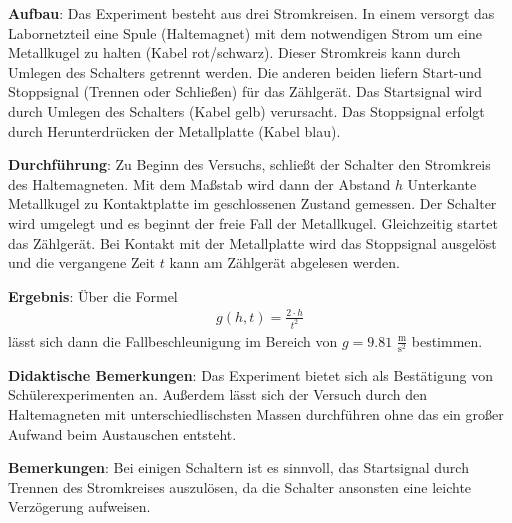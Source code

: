 \documentclass[../main.tex]{subfiles}
\begin{document}
\begin{tcolorbox}
    \vspace{0.5cm}
    \textbf{Aufbau}: Das Experiment besteht aus drei Stromkreisen. In einem versorgt das Labornetzteil eine Spule (Haltemagnet) mit dem notwendigen Strom um eine Metallkugel zu halten (Kabel rot/schwarz). Dieser Stromkreis kann durch Umlegen des Schalters getrennt werden. Die anderen beiden liefern Start-und Stoppsignal (Trennen oder Schließen) für das Zählgerät. Das Startsignal wird durch Umlegen des Schalters (Kabel gelb) verursacht. Das Stoppsignal erfolgt durch Herunterdrücken der Metallplatte (Kabel blau).
    
    \vspace{0.5cm}
    \textbf{Durchführung}: Zu Beginn des Versuchs, schließt der Schalter den Stromkreis des Haltemagneten. Mit dem Maßstab wird dann der Abstand $h$ \glqq Unterkante  Metallkugel\grqq{} zu \glqq Kontaktplatte im geschlossenen Zustand\grqq{} gemessen. Der Schalter wird umgelegt und es beginnt der freie Fall der Metallkugel. Gleichzeitig startet das Zählgerät. Bei Kontakt mit der Metallplatte wird das Stoppsignal ausgelöst und die vergangene Zeit $t$ kann am Zählgerät abgelesen werden.  

    \vspace{0.5cm}
    \textbf{Ergebnis}: Über die Formel
    \begin{align*}
        g(h,t) = \frac{2 \cdot h}{t^2}
    \end{align*}
    lässt sich dann die Fallbeschleunigung im Bereich von $g=9.81 \,\, \frac{\text{m}}{\text{s}^2}$ bestimmen. 
    
    \vspace{0.5cm}
    \textbf{Didaktische Bemerkungen}: Das Experiment bietet sich als Bestätigung von Schülerexperimenten an. Außerdem lässt sich der Versuch durch den Haltemagneten mit unterschiedlischsten Massen durchführen ohne das ein großer Aufwand beim Austauschen entsteht.

    \vspace{0.5cm}
    \textbf{Bemerkungen}: Bei einigen Schaltern ist es sinnvoll, das Startsignal durch Trennen des Stromkreises auszulösen, da die Schalter ansonsten eine leichte Verzögerung aufweisen.

    \vspace{0cm}
\end{tcolorbox}
\end{document}
